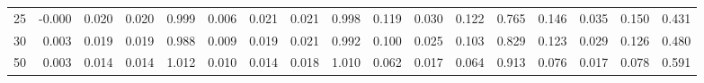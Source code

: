 \documentclass{article}
\begin{document}
{\begin{tabular}{c r r r r r r r r r r r r r r r r}
25 &     -0.000 &      0.020 &      0.020 &      0.999 &      0.006 &      0.021 &      0.021 &      0.998 &      0.119 &      0.030 &      0.122 &      0.765 &      0.146 &      0.035 &      0.150 &      0.431\\
30 &      0.003 &      0.019 &      0.019 &      0.988 &      0.009 &      0.019 &      0.021 &      0.992 &      0.100 &      0.025 &      0.103 &      0.829 &      0.123 &      0.029 &      0.126 &      0.480\\
50 &      0.003 &      0.014 &      0.014 &      1.012 &      0.010 &      0.014 &      0.018 &      1.010 &      0.062 &      0.017 &      0.064 &      0.913 &      0.076 &      0.017 &      0.078 &      0.591\\[0pt]
\bottomrule 
\end{tabular}
} 
\end{document}
